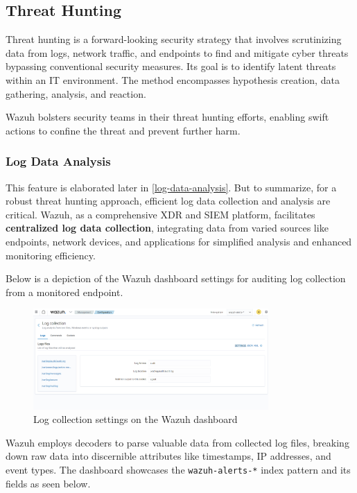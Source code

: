 \subsection{Threat Hunting}
Threat hunting is a forward-looking security strategy that involves scrutinizing data from logs, network traffic, and endpoints to find and mitigate cyber threats bypassing conventional security measures. Its goal is to identify latent threats within an IT environment. The method encompasses hypothesis creation, data gathering, analysis, and reaction.

Wazuh bolsters security teams in their threat hunting efforts, enabling swift actions to confine the threat and prevent further harm.

\subsubsection{Log Data Analysis}
This feature is elaborated later in \ref{log-data-analysis}. But to summarize, for a robust threat hunting approach, efficient log data collection and analysis are critical. Wazuh, as a comprehensive XDR and SIEM platform, facilitates \textbf{centralized log data collection}, integrating data from varied sources like endpoints, network devices, and applications for simplified analysis and enhanced monitoring efficiency.

Below is a depiction of the Wazuh dashboard settings for auditing log collection from a monitored endpoint.

\begin{figure}[H]
    \centering
    \includegraphics[width=0.8\textwidth]{images/threat-hunting/log-collection-settings.png}
    \caption{Log collection settings on the Wazuh dashboard}
    \label{fig:log-collection-settings}
\end{figure}

Wazuh employs decoders to parse valuable data from collected log files, breaking down raw data into discernible attributes like timestamps, IP addresses, and event types. The dashboard showcases the \texttt{wazuh-alerts-*} index pattern and its fields as seen below.

